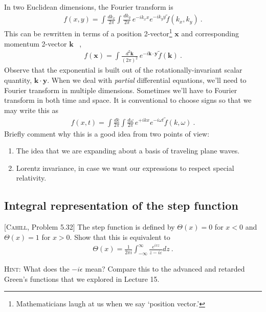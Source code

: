 \documentclass[12pt]{article}
\numberwithin{equation}{subsection}    %
\renewcommand{\tilde}{\widetilde}   %
\renewcommand{\vec}[1]{\mathbf{#1}} %
\begin{document}
In two Euclidean dimensions, the Fourier transform is
\begin{align}
	f(x, y) = \int\frac{dk_x}{2\pi} \int\frac{dk_y}{2\pi} \, e^{-ik_xx} e^{-ik_yy} \tilde f(k_x, k_y) \ .
\end{align}
This can be rewritten in terms of a position 2-vector\footnote{Mathematicians laugh at us when we say `position vector.'} $\vec{x}$ and corresponding momentum 2-vector $\vec{k}$ \ , 
\begin{align}
	f(\vec x) = \int\frac{d^2\vec k}{(2\pi)^2}  \, e^{-i\vec k\cdot \vec y} \tilde f(\vec k) \ .
\end{align}
Observe that the exponential is built out of the rotationally-invariant scalar quantity, $\vec k\cdot \vec y$. 
%
When we deal with \emph{partial} differential equations, we'll need to Fourier transform in multiple dimensions. Sometimes we'll have to Fourier transform in both time and space. It is conventional to choose signs so that we may write this as 
\begin{align}
	f(x, t) = \int\frac{dk}{2\pi} \int\frac{d\omega}{2\pi} \, e^{+ikx} e^{-i\omega t} \tilde f(k, \omega) \ .
\end{align}
Briefly comment why this is a good idea from two points of view:
\begin{enumerate}
	\item The idea that we are expanding about a basis of traveling plane waves. 
	\item Lorentz invariance, in case we want our expressions to respect special relativity.
\end{enumerate}

\subsection{Integral representation of the step function}

[\textsc{Cahill}, Problem 5.32] 
The step function is defined by $\Theta(x) = 0$ for $x<0$ and $\Theta(x) = 1$ for $x>0$. Show that this is equivalent to
\begin{align}
	\Theta(x) = \frac{1}{2\pi i}\int_{-\infty}^\infty \frac{e^{ixz}}{z-i\varepsilon} dz \ .
\end{align}

\textsc{Hint}: What does the $-i\epsilon$ mean? Compare this to the advanced and retarded Green's functions that we explored in Lecture 15. 


\end{document}
